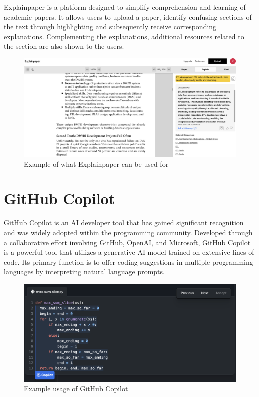 \documentclass[
]{book}
\begin{document}
Explainpaper is a platform designed to simplify comprehension and learning of academic papers. It allows users to upload a paper, identify confusing sections of the text through highlighting and subsequently receive corresponding explanations. Complementing the explanations, additional resources related to the section are also shown to the users.

\begin{figure}

{\centering \includegraphics[width=0.9\linewidth]{Explainpaper_Example} 

}

\caption{Example of what Explainpaper can be used for}\label{fig:unnamed-chunk-9}
\end{figure}

\hypertarget{github-copilot}{%
\section{GitHub Copilot}\label{github-copilot}}

GitHub Copilot is an AI developer tool that has gained significant recognition and was widely adopted within the programming community. Developed through a collaborative effort involving GitHub, OpenAI, and Microsoft, GitHub Copilot is a powerful tool that utilizes a generative AI model trained on extensive lines of code. Its primary function is to offer coding suggestions in multiple programming languages by interpreting natural language prompts.

\begin{figure}

{\centering \includegraphics[width=0.95\linewidth]{GitHub_Copilot_Example} 

}

\caption{Example usage of GitHub Copilot}\label{fig:unnamed-chunk-10}
\end{figure}
\end{document}
